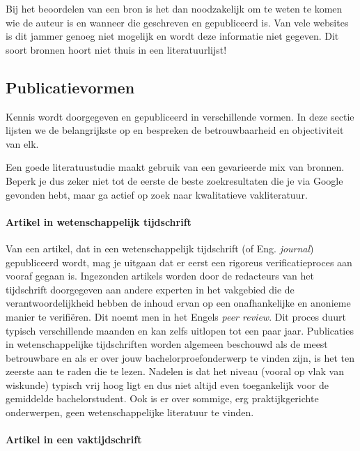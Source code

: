 Bij het beoordelen van een bron is het dan noodzakelijk om te weten te komen wie de auteur is en wanneer die geschreven en gepubliceerd is. Van vele websites is dit jammer genoeg niet mogelijk en wordt deze informatie niet gegeven. Dit soort bronnen hoort niet thuis in een literatuurlijst!

\subsection{Publicatievormen}%
\label{sub:publicatievormen}

Kennis wordt doorgegeven en gepubliceerd in verschillende vormen. In deze sectie lijsten we de belangrijkste op en bespreken de betrouwbaarheid en objectiviteit van elk.

Een goede literatuustudie maakt gebruik van een gevarieerde mix van bronnen. Beperk je dus zeker niet tot de eerste de beste zoekresultaten die je via Google gevonden hebt, maar ga actief op zoek naar kwalitatieve vakliteratuur.

\paragraph{Artikel in wetenschappelijk tijdschrift}

Van een artikel, dat in een wetenschappelijk tijdschrift (of Eng. \emph{journal}) gepubliceerd wordt, mag je uitgaan dat er eerst een rigoreus verificatieproces aan vooraf gegaan is. Ingezonden artikels worden door de redacteurs van het tijdschrift doorgegeven aan andere experten in het vakgebied die de verantwoordelijkheid hebben de inhoud ervan op een onafhankelijke en anonieme manier te verifiëren. Dit noemt men in het Engels \emph{peer review}. Dit proces duurt typisch verschillende maanden en kan zelfs uitlopen tot een paar jaar. Publicaties in wetenschappelijke tijdschriften worden algemeen beschouwd als de meest betrouwbare en als er over jouw bachelorproefonderwerp te vinden zijn, is het ten zeerste aan te raden die te lezen. Nadelen is dat het niveau (vooral op vlak van wiskunde) typisch vrij hoog ligt en dus niet altijd even toegankelijk voor de gemiddelde bachelorstudent. Ook is er over sommige, erg praktijkgerichte onderwerpen, geen wetenschappelijke literatuur te vinden.

\paragraph{Artikel in een vaktijdschrift}


